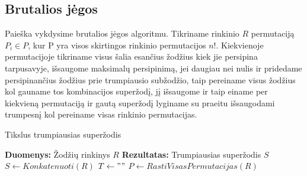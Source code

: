 \documentclass{VUMIFInfKursinis}
\begin{document}
\subsection{Brutalios jėgos}
Paieška vykdysime brutalios jėgos algoritmu. Tikriname rinkinio $R$ permutaciją $P_i \in P$, kur P yra visos skirtingos rinkinio permutacijos $n!$. Kiekvienoje permutacijoje tikriname visus šalia esančius žodžius kiek jie persipina tarpusavyje, išsaugome maksimalų persipinimą, jei daugiau nei nulis ir pridedame persipinančius žodžius prie trumpiausio subžodžio, taip pereiname visus žodžius kol gauname tos kombinacijos superžodį, jį išsaugome ir taip einame per kiekvieną permutaciją ir gautą superžodį lyginame su praeitu išsaugodami trumpesnį kol pereiname visas rinkinio permutacijas.
\begin{algorithm}[H]
  \caption{Tikslus trumpiausias superžodis}
  \DontPrintSemicolon
  \textbf{Duomenys:} Žodžių rinkinys $R$ \;
  \textbf{Rezultatas:} Trumpiausias superžodis $S$\;
  $S \gets Konkatenuoti(R)$ \;
  $T \gets ""$ \;
  $P \gets RastiVisasPermutacijas(R)$ \;
\end{algorithm}
\end{document}

